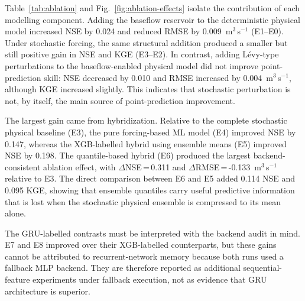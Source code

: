 \documentclass[a4paper,fleqn]{cas-sc}
\begin{document}
Table~\ref{tab:ablation} and Fig.~\ref{fig:ablation-effects} isolate
the contribution of each modelling component. Adding the baseflow
reservoir to the deterministic physical model increased NSE by 0.024
and reduced RMSE by 0.009~m$^3$\,s$^{-1}$ (E1--E0). Under stochastic
forcing, the same structural addition produced a smaller but still
positive gain in NSE and KGE (E3--E2). In contrast, adding
L\'{e}vy-type perturbations to the baseflow-enabled physical model did
not improve point-prediction skill: NSE decreased by 0.010 and RMSE
increased by 0.004~m$^3$\,s$^{-1}$, although KGE increased slightly.
This indicates that stochastic perturbation is not, by itself, the main
source of point-prediction improvement.

The largest gain came from hybridization. Relative to the complete
stochastic physical baseline (E3), the pure forcing-based ML model
(E4) improved NSE by 0.147, whereas the XGB-labelled hybrid using
ensemble means (E5) improved NSE by 0.198. The quantile-based hybrid
(E6) produced the largest backend-consistent ablation effect, with
$\Delta$NSE\,=\,0.311 and $\Delta$RMSE\,=\,-0.133~m$^3$\,s$^{-1}$
relative to E3. The direct comparison between E6 and E5 added
0.114 NSE and 0.095 KGE, showing that ensemble quantiles carry useful
predictive information that is lost when the stochastic physical
ensemble is compressed to its mean alone.

The GRU-labelled contrasts must be interpreted with the backend audit
in mind. E7 and E8 improved over their XGB-labelled counterparts, but
these gains cannot be attributed to recurrent-network memory because
both runs used a fallback MLP backend. They are therefore reported as
additional sequential-feature experiments under fallback execution, not
as evidence that GRU architecture is superior.
\end{document}
